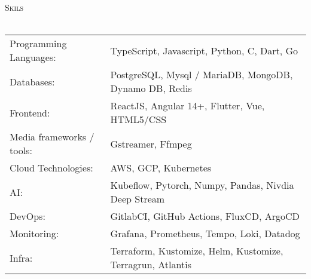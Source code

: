 \documentclass[a4paper]{article}
\newcommand{\lineunder} {
    \vspace*{-8pt} \\
    \hspace*{-18pt} \hrulefill \\
}
\newcommand{\header} [1] {
    {\hspace*{-18pt}\vspace*{6pt} \textsc{#1}}
    \vspace*{-6pt} \lineunder
}
\begin{document}
\header{Skils}
\begin{tabular}{ l l }
	Programming Languages:    & TypeScript, Javascript, Python, C, Dart, Go                \\
	Databases:                & PostgreSQL, Mysql / MariaDB, MongoDB, Dynamo DB, Redis     \\
	Frontend:                 & ReactJS, Angular 14+, Flutter, Vue, HTML5/CSS              \\
	Media frameworks / tools: & Gstreamer, Ffmpeg                                          \\
	Cloud Technologies:       & AWS, GCP, Kubernetes                                       \\
	AI:                       & Kubeflow, Pytorch, Numpy, Pandas, Nivdia Deep Stream       \\
	DevOps:                   & GitlabCI, GitHub Actions, FluxCD, ArgoCD                   \\
	Monitoring:               & Grafana, Prometheus, Tempo, Loki, Datadog                  \\
	Infra:                    & Terraform, Kustomize, Helm, Kustomize, Terragrun, Atlantis \\
\end{tabular}
\vspace{2mm}
\end{document}
